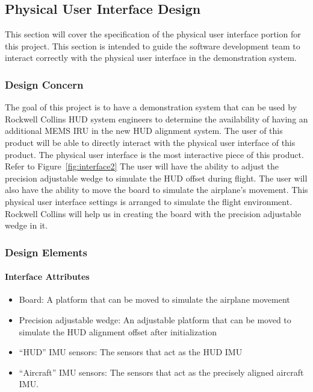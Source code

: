 	\subsection{Physical User Interface Design}
	This section will cover the specification of the physical user interface portion for this project. This section is intended to guide the software development team to interact correctly with the physical user interface in the demonstration system.\\

		\subsubsection{Design Concern}
		The goal of this project is to have a demonstration system that can be used by Rockwell Collins HUD system engineers to determine the availability of having an additional MEMS IRU in the new HUD alignment system. The user of this product will be able to directly interact with the physical user interface of this product. The physical user interface is the most interactive piece of this product. Refer to Figure~\ref{fig:interface2} The user will have the ability to adjust the precision adjustable wedge to simulate the HUD offset during flight. The user will also have the ability to move the board to simulate the airplane’s movement. This physical user interface settings is arranged to simulate the flight environment. Rockwell Collins will help us in creating the board with the precision adjustable wedge in it.\\

		\subsubsection{Design Elements}
		\paragraph{Interface Attributes}
			\begin{itemize}
				\item Board: A platform that can be moved to simulate the airplane movement 
				\item Precision adjustable wedge: An adjustable platform that can be moved to simulate the HUD alignment offset after initialization  
				\item “HUD” IMU sensors: The sensors that act as the HUD IMU 
				\item “Aircraft” IMU sensors: The sensors that act as the precisely aligned aircraft IMU.\\
			\end{itemize}

